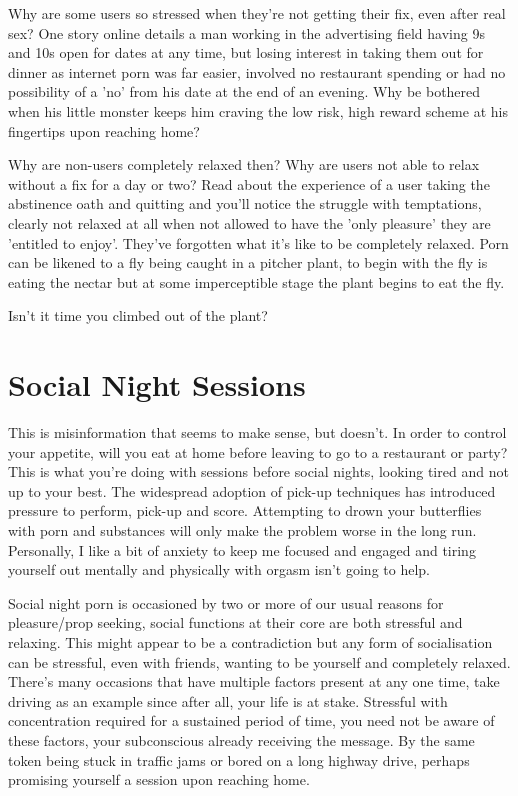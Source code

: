 \documentclass[easypeasy.tex]{subfiles}
\begin{document}
Why are some users so stressed when they're not getting their fix, even after real sex? One story online details a man working in the advertising field having 9s and 10s open for dates at any time, but losing interest in taking them out for dinner as internet porn was far easier, involved no restaurant spending or had no possibility of a 'no' from his date at the end of an evening. Why be bothered when his little monster keeps him craving the low risk, high reward scheme at his fingertips upon reaching home?

Why are non-users completely relaxed then? Why are users not able to relax without a fix for a day or two? Read about the experience of a user taking the abstinence oath and quitting and you'll notice the struggle with temptations, clearly not relaxed at all when not allowed to have the 'only pleasure' they are 'entitled to enjoy'. They've forgotten what it's like to be completely relaxed. Porn can be likened to a fly being caught in a pitcher plant, to begin with the fly is eating the nectar but at some imperceptible stage the plant begins to eat the fly.

Isn't it time you climbed out of the plant?

\section{Social Night Sessions}

This is misinformation that seems to make sense, but doesn't. In order to control your appetite, will you eat at home before leaving to go to a restaurant or party? This is what you're doing with sessions before social nights, looking tired and not up to your best. The widespread adoption of pick-up techniques has introduced pressure to perform, pick-up and score. Attempting to drown your butterflies with porn and substances will only make the problem worse in the long run. Personally, I like a bit of anxiety to keep me focused and engaged and tiring yourself out mentally and physically with orgasm isn't going to help.

Social night porn is occasioned by two or more of our usual reasons for pleasure/prop seeking, social functions at their core are both stressful and relaxing. This might appear to be a contradiction but any form of socialisation can be stressful, even with friends, wanting to be yourself and completely relaxed. There's many occasions that have multiple factors present at any one time, take driving as an example since after all, your life is at stake. Stressful with concentration required for a sustained period of time, you need not be aware of these factors, your subconscious already receiving the message. By the same token being stuck in traffic jams or bored on a long highway drive, perhaps promising yourself a session upon reaching home.
\end{document}
